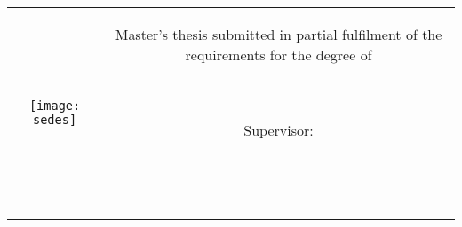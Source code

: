 \begin{titlepage}
\null\vfill
\begin{center}
\large
\sffamily

\vspace{2cm}
{\Large\spacedlowsmallcaps{\myName}} \\
\bigskip


{\huge\spacedlowsmallcaps{\myTitle} \\
}



\bigskip

    
\vspace{7cm}

\begin{tabular} {cc}
\parbox{0.3\textwidth}{\texttt{[image: sedes]}}
&
\parbox{0.7\textwidth}{\normalsize{Master's thesis submitted in 
	partial fulfilment of the requirements for the degree 
		of}\\ \\ {\Large\spacedlowsmallcaps{\myDegree}}\\ 

					{\normalsize
					Supervisor: \myProf \\
					\myUni \\
					\myFac \\
					\myDepartment \\
					}}
\end{tabular}
\vfill
{}
\end{center}
\end{titlepage}



